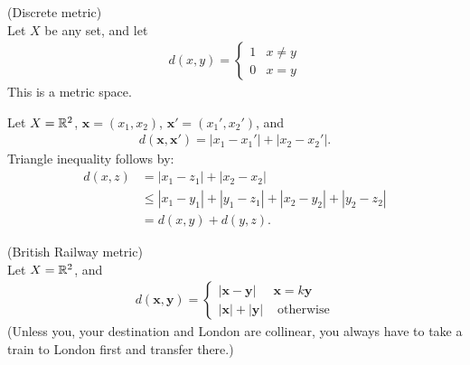 \documentclass[a4paper]{article}
\begin{document}
\begin{eg} (Discrete metric)\\
Let $X$ be any set, and let
\begin{equation*}
\begin{aligned}
d\left(x,y\right) = \left\{
\begin{array}{ll}
1 & x\neq y\\
0 & x=y
\end{array}
\right.
\end{aligned}
\end{equation*}
This is a metric space.
\end{eg}

\begin{eg}
Let $X=\mathbb{R}^2$, $\mathbf{x}=\left(x_1,x_2\right)$, $\mathbf{x}'=\left(x_1',x_2'\right)$, and
\begin{equation*}
\begin{aligned}
d\left(\mathbf{x},\mathbf{x}'\right) = |x_1-x_1'| + |x_2-x_2'|.
\end{aligned}
\end{equation*}
Triangle inequality follows by:
\begin{equation*}
\begin{aligned}
d\left(x,z\right) &= |x_1-z_1| + |x_2-x_2| \\
&\leq |x_1-y_1| + |y_1-z_1| + |x_2 - y_2| + |y_2 - z_2| \\
&= d\left(x,y\right) + d\left(y,z\right).
\end{aligned}
\end{equation*}
\end{eg}

\begin{eg} (British Railway metric)\\
Let $X=\mathbb{R}^2$, and
\begin{equation*}
\begin{aligned}
d\left(\mathbf{x},\mathbf{y}\right) = \left\{
\begin{array}{ll}
|\mathbf{x}-\mathbf{y}| &  \mathbf{x}=k\mathbf{y}\\
|\mathbf{x}| + |\mathbf{y}| & \text{ otherwise}
\end{array}
\right.
\end{aligned}
\end{equation*}
(Unless you, your destination and London are collinear, you always have to take a train to London first and transfer there.)
\end{eg}
\end{document}
